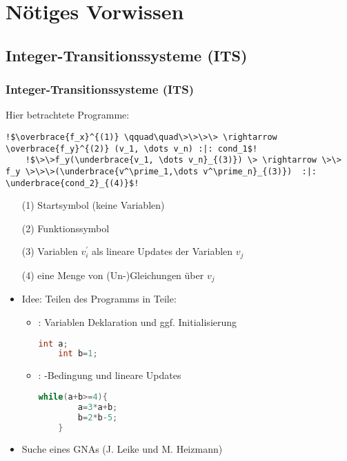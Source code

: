 \section{N{\"o}tiges Vorwissen}

\subsection{Integer-Transitionssysteme (ITS) }
\frame{\tableofcontents[currentsection]}
\begin{frame}[fragile] %
	\frametitle{Integer-Transitionssysteme (ITS)}
	Hier betrachtete Programme:
	\begin{lstlisting}[escapechar=!]
	!$\overbrace{f_x}^{(1)} \qquad\quad\>\>\>\> \rightarrow \overbrace{f_y}^{(2)} (v_1, \dots v_n) :|: cond_1$!
	!$\>\>f_y(\underbrace{v_1, \dots v_n}_{(3)}) \> \rightarrow \>\> f_y \>\>\>(\underbrace{v^\prime_1,\dots v^\prime_n}_{(3)})  :|: \underbrace{cond_2}_{(4)}$!
	\end{lstlisting}
	
	\begin{enumerate}
		\item[(1)] Startsymbol (keine Variablen)
		\item[(2)] Funktionssymbol
		\item[(3)] Variablen $v^\prime_i$ als lineare Updates der Variablen $v_j$
		\item[(4)] eine Menge von (Un-)Gleichungen \"uber $v_j$
	\end{enumerate}
\end{frame}


\begin{frame}[fragile]
	\begin{itemize}
		\item Idee: Teilen des Programms in  Teile:
			\begin{itemize}
				\item \stem: Variablen Deklaration und ggf. Initialisierung
					\begin{lstlisting}[language = java]
	int a;
	int b=1;
					\end{lstlisting}
				\item \loopt: -Bedingung und lineare Updates
				\begin{lstlisting}[language = java]
	while(a+b>=4){
		a=3*a+b;
		b=2*b-5;
	}
				\end{lstlisting}
			\end{itemize}
		\item Suche eines GNAs (J. Leike und M. Heizmann)
	\end{itemize}
\end{frame}

